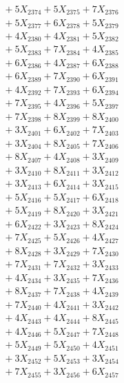 \documentclass[a4paper,10pt]{article}
\begin{document}
{\begin{align}
&\;  + 5 X_{2374} + 5 X_{2375} + 7 X_{2376} \\[0.3ex]
&\;  + 5 X_{2377} + 6 X_{2378} + 5 X_{2379} \\[0.5ex]\allowbreak
&\;  + 4 X_{2380} + 4 X_{2381} + 5 X_{2382} \\[0.3ex]
&\;  + 5 X_{2383} + 7 X_{2384} + 4 X_{2385} \\[0.3ex]
&\;  + 6 X_{2386} + 4 X_{2387} + 6 X_{2388} \\[0.3ex]
&\;  + 6 X_{2389} + 7 X_{2390} + 6 X_{2391} \\[0.3ex]
&\;  + 4 X_{2392} + 7 X_{2393} + 6 X_{2394} \\[0.3ex]
&\;  + 7 X_{2395} + 4 X_{2396} + 5 X_{2397} \\[0.3ex]
&\;  + 7 X_{2398} + 8 X_{2399} + 8 X_{2400} \\[0.3ex]
&\;  + 3 X_{2401} + 6 X_{2402} + 7 X_{2403} \\[0.3ex]
&\;  + 3 X_{2404} + 8 X_{2405} + 7 X_{2406} \\[0.3ex]
&\;  + 8 X_{2407} + 4 X_{2408} + 3 X_{2409} \\[0.5ex]\allowbreak
&\;  + 3 X_{2410} + 8 X_{2411} + 3 X_{2412} \\[0.3ex]
&\;  + 3 X_{2413} + 6 X_{2414} + 3 X_{2415} \\[0.3ex]
&\;  + 5 X_{2416} + 5 X_{2417} + 6 X_{2418} \\[0.3ex]
&\;  + 5 X_{2419} + 8 X_{2420} + 3 X_{2421} \\[0.3ex]
&\;  + 6 X_{2422} + 3 X_{2423} + 8 X_{2424} \\[0.3ex]
&\;  + 7 X_{2425} + 5 X_{2426} + 4 X_{2427} \\[0.3ex]
&\;  + 8 X_{2428} + 3 X_{2429} + 7 X_{2430} \\[0.3ex]
&\;  + 7 X_{2431} + 7 X_{2432} + 3 X_{2433} \\[0.3ex]
&\;  + 4 X_{2434} + 3 X_{2435} + 7 X_{2436} \\[0.3ex]
&\;  + 8 X_{2437} + 7 X_{2438} + 4 X_{2439} \\[0.5ex]\allowbreak
&\;  + 7 X_{2440} + 4 X_{2441} + 3 X_{2442} \\[0.3ex]
&\;  + 4 X_{2443} + 4 X_{2444} + 8 X_{2445} \\[0.3ex]
&\;  + 4 X_{2446} + 5 X_{2447} + 7 X_{2448} \\[0.3ex]
&\;  + 5 X_{2449} + 5 X_{2450} + 4 X_{2451} \\[0.3ex]
&\;  + 3 X_{2452} + 5 X_{2453} + 3 X_{2454} \\[0.3ex]
&\;  + 7 X_{2455} + 3 X_{2456} + 6 X_{2457} \\[0.3ex]

\end{align}}
\end{document}
